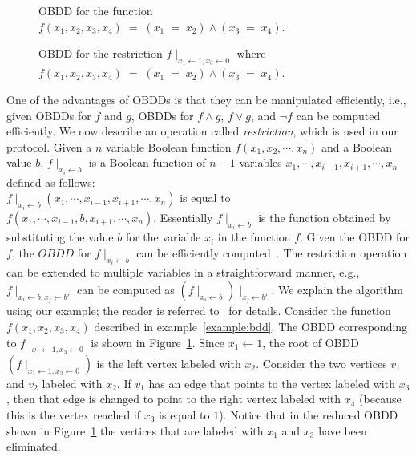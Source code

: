 \begin{figure}
\begin{minipage}{3in}
\centering
{}
\caption{OBDD for the function $f(x_1,x_2,x_3, x_4) \; = \; (x_1 \; = \; x_2) \wedge (x_3 \; = \;
x_4)$.}
\label{fig:OBDD}
\end{minipage}
\hfill
\begin{minipage}{3in}
\centering
{}
\caption{OBDD for the restriction $f \mid_{x_1 \leftarrow 1, x_3 \leftarrow 0}$ where
 $f(x_1,x_2,x_3, x_4) \; = \; (x_1 \; = \; x_2) \wedge (x_3 \; = \;
x_4)$.}
\label{fig:OBDD-reduced}
\end{minipage}
\end{figure}


One of the advantages of OBDDs is that they can be manipulated
efficiently, i.e., given OBDDs for $f$ and $g$, OBDDs for $f \wedge
g$, $f \vee g$, and $\neg f$ can be computed efficiently. We now
describe an operation called {\it restriction}, which is used in our
protocol.  Given a $n$ variable Boolean function
$f(x_1,x_2,\cdots,x_n)$ and a Boolean value $b$, $f
\mid_{x_i \leftarrow b}$ is a Boolean function of $n-1$ variables
$x_1, \cdots, x_{i-1},x_{i+1},\cdots,x_n$ defined as follows:\\
$f \mid_{x_i \leftarrow b} (x_1, \cdots, x_{i-1},x_{i+1},\cdots,x_n)$ is
equal to \\ $f(x_1, \cdots, x_{i-1},b,x_{i+1},\cdots,x_n)$.
Essentially $f \mid_{x_i \leftarrow b}$ is the function obtained by substituting
the value $b$ for the variable $x_i$ in the function $f$. 
Given the OBDD for $f$, the $OBDD$ for $f \mid_{x_i \leftarrow b}$ can
be efficiently computed~\cite[Section 4]{Bryant:BDD}.  The restriction
operation can be extended to multiple variables in a
straightforward manner, e.g., $f \mid_{x_i \leftarrow b, x_j \leftarrow b'}$
can be computed as $(f \mid_{x_i \leftarrow b}) \mid_{x_j \leftarrow b'}$. We
explain the algorithm using our example; the reader is referred to~\cite{Bryant:BDD}
for details. 
Consider the function $f(x_1,x_2,x_3,x_4)$
described in example~\ref{example:bdd}. The OBDD corresponding to $f
\mid_{x_1 \leftarrow 1, x_3 \leftarrow 0}$ is shown in
Figure~\ref{fig:OBDD-reduced}.  
Since $x_1 \leftarrow 1$, the root of OBDD $(f\mid_{x_1 \leftarrow 1, x_3 \leftarrow 0})$
is the left vertex labeled with $x_2$. Consider the two vertices $v_1$
and $v_2$ labeled with $x_2$. If $v_1$ has an edge that points to the vertex labeled with $x_3$, then
that edge is changed to point to the right vertex labeled with $x_4$ (because this is the vertex
reached if $x_3$ is equal to $1$). 
Notice that in the reduced OBDD shown in Figure~\ref{fig:OBDD-reduced}
the vertices that are labeled with $x_1$ and $x_3$ have been eliminated. 

